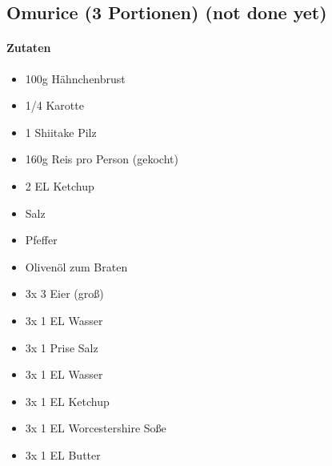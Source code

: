 \newpage
\subsection{Omurice (3 Portionen) (not done yet)}
\paragraph{Zutaten}
\begin{itemize}[noitemsep]
	\item 100g Hähnchenbrust
	\item 1/4 Karotte
	\item 1 Shiitake Pilz
	\item 160g Reis pro Person (gekocht)
	\item 2 EL Ketchup
	\item Salz
	\item Pfeffer
	\item Olivenöl zum Braten
	\vspace{0.5cm}
	\item 3x 3 Eier (groß)
	\item 3x 1 EL Wasser
	\item 3x 1 Prise Salz
	\vspace{0.5cm}
	\item 3x 1 EL Wasser
	\item 3x 1 EL Ketchup
	\item 3x 1 EL Worcestershire Soße
	\item 3x 1 EL Butter
\end{itemize}
